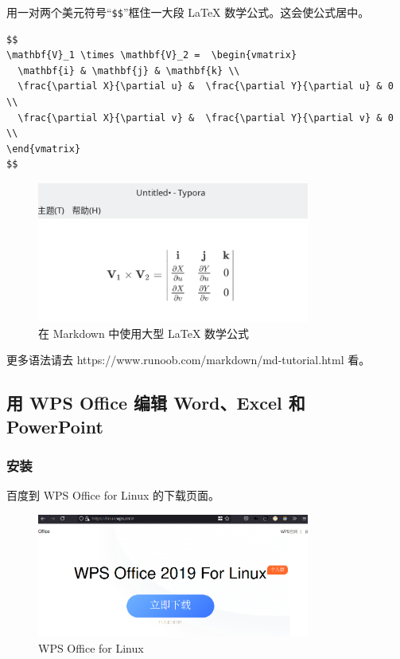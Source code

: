 \documentclass[UTF-8]{ctexart}
\begin{document}
				用一对两个美元符号“\texttt{\$\$}”框住一大段 LaTeX 数学公式。这会使公式居中。

				\begin{verbatim}
$$
\mathbf{V}_1 \times \mathbf{V}_2 =  \begin{vmatrix} 
  \mathbf{i} & \mathbf{j} & \mathbf{k} \\
  \frac{\partial X}{\partial u} &  \frac{\partial Y}{\partial u} & 0 \\
  \frac{\partial X}{\partial v} &  \frac{\partial Y}{\partial v} & 0 \\
\end{vmatrix}
$$
				\end{verbatim}
			
				\begin{figure}[H]
					\centering
					\includegraphics[width=0.8\textwidth]{fig/markdown_bigmath.png}
					\caption*{在 Markdown 中使用大型 LaTeX 数学公式}
				\end{figure}
			
				更多语法请去 https://www.runoob.com/markdown/md-tutorial.html 看。
				
		\subsection{用 WPS Office 编辑 Word、Excel 和 PowerPoint}
		
			\subsubsection{安装}
			
				百度到 WPS Office for Linux 的下载页面。
				
				\begin{figure}[H]
					\centering
					\includegraphics[width=0.8\textwidth]{fig/wps_office.png}
					\caption*{WPS Office for Linux}
				\end{figure}
			
\end{document}
